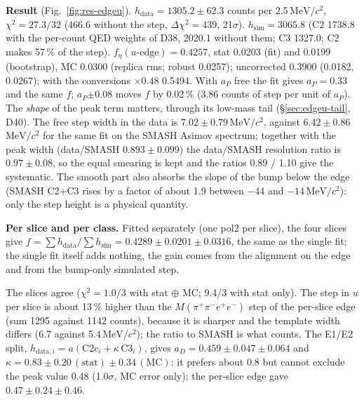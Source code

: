\documentclass[11pt,a4paper]{article}
\newcommand{\Mfour}{\ensuremath{M(\pi^{+}\pi^{-}e^{+}e^{-})}\xspace}
\newcommand{\MeVcc}{\ensuremath{\mathrm{MeV}/c^{2}}\xspace}
\newcommand{\aP}{\ensuremath{a_P}\xspace}
\newcommand{\tabin}[1]{}
\begin{document}
\textbf{Result} (Fig.~\ref{fig:res-edgeu}). $h_{\mathrm{data}}=1305.2\pm62.3$ counts per 2.5\,\MeVcc, $\chi^2=27.3/32$ (466.6 without the step,
$\Delta\chi^2=439$, 21$\sigma$). $h_{\mathrm{sim}}=3065.8$ (C2 1738.8 with the per-count QED weights of D38, 2020.1 without them; C3 1327.0; C2 makes
57\,\% of the step). $f_\eta(u\text{-edge})=0.4257$, stat 0.0203 (fit) and 0.0199 (bootstrap), MC 0.0300 (replica rms; robust 0.0257); uncorrected
0.3900 (0.0182, 0.0267); with the conversions $\times0.48$ 0.5494. With \aP free the fit gives $\aP=0.33$ and the same $f$; \aP$\pm0.08$ moves $f$ by
0.02\,\% (3.86 counts of step per unit of \aP). The \emph{shape} of the peak term matters, through its low-mass tail (\S\ref{sec:edgeu-tail}, D40). The free step width in the data is $7.02\pm0.79$\,\MeVcc, against $6.42\pm0.86$\,\MeVcc for the same
fit on the SMASH Asimov spectrum; together with the peak width (data/SMASH $0.893\pm0.099$) the data/SMASH resolution ratio is $0.97\pm0.08$, so
the equal smearing is kept and the ratios 0.89 / 1.10 give the systematic. The smooth part also absorbs the slope of the bump below the edge
(SMASH C2+C3 rises by a factor of about 1.9 between $-44$ and $-14$\,\MeVcc): only the step height is a physical quantity.

\textbf{Per slice and per class.} Fitted separately (one pol2 per slice), the four slices give $f=\sum h_{\mathrm{data}}/\sum h_{\mathrm{sim}}=
0.4289\pm0.0201\pm0.0316$, the same as the single fit; the single fit itself adds nothing, the gain comes from the alignment on the edge and from
the bump-only simulated step.
\begin{center}\small
\resizebox{\textwidth}{!}{%
\tabin{edgeu_slices_v3.tex}}
\end{center}
The slices agree ($\chi^2=1.0/3$ with stat $\oplus$ MC; 9.4/3 with stat only). The step in $u$ per slice is about 13\,\% higher than the \Mfour step
of the per-slice edge (sum 1295 against 1142 counts), because it is sharper and the template width differs (6.7 against 5.4\,\MeVcc); the ratio to
SMASH is what counts. The E1/E2 split, $h_{\mathrm{data},i}=a(\mathrm{C2c}_i+\kappa\,\mathrm{C3}_i)$, gives $a_D=0.459\pm0.047\pm0.064$ and
$\kappa=0.83\pm0.20\,(\mathrm{stat})\pm0.34\,(\mathrm{MC})$: it prefers about 0.8 but cannot exclude the peak value 0.48 (1.0$\sigma$, MC error
only); the per-slice edge gave $0.47\pm0.24\pm0.46$.
\end{document}
